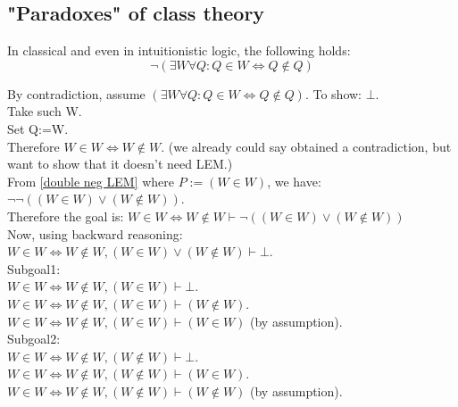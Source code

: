 \subsection{"Paradoxes" of class theory}



\begin{theorem}
\label{Russel's Paradox}
In classical and even in intuitionistic logic, the following holds:
\[
\neg (\exists W \forall Q: Q\in W \iff Q\notin Q)
\]
\end{theorem}
\Proof
\noindent By contradiction, assume $(\exists W \forall Q: Q\in W \iff Q\notin Q)$. To show: $\bot$.\\
Take such W.\\
Set Q:=W.\\
Therefore $W\in W \iff W\notin W.$ (we already could say obtained a contradiction, but want to show that it doesn't need LEM.)\\
From \ref{double neg LEM} where $P:=(W\in W)$, we have:
$\neg\neg((W\in W)\lor(W\notin W))$.\\
Therefore the goal is:
$W\in W \iff W\notin W \vdash \neg((W\in W)\lor(W\notin W))$\\
Now, using backward reasoning:\\
$W\in W \iff W\notin W, (W\in W)\lor(W\notin W) \vdash \bot$.\\
Subgoal1:\\
$W\in W \iff W\notin W, (W\in W) \vdash \bot$.\\
$W\in W \iff W\notin W, (W\in W) \vdash (W\notin W)$.\\
$W\in W \iff W\notin W, (W\in W) \vdash (W\in W)$ (by assumption).\\
Subgoal2:\\
$W\in W \iff W\notin W, (W\notin W) \vdash \bot$.\\
$W\in W \iff W\notin W, (W\notin W) \vdash (W\in W)$.\\
$W\in W \iff W\notin W, (W\notin W) \vdash (W\notin W)$ (by assumption).\\
\Done



